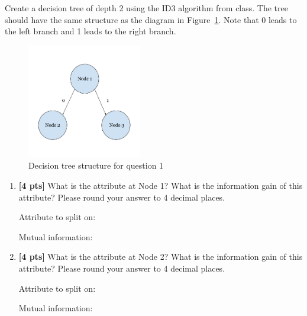 \begin{enumerate}
Create a decision tree of depth 2 using the ID3 algorithm from class. The tree should have the same structure as the diagram in Figure~\ref{fig:tree}. Note that 0 leads to the left branch and 1 leads to the right branch. 
\begin{figure}[ht]
\begin{center}
  \includegraphics[width=5cm]{images/decisiontree.png}
\end{center}
  \caption{Decision tree structure for question 1}
\label{fig:tree}
\end{figure}
\begin{enumerate}[label=(\roman*)]

\newpage

\item \textbf{[4 pts]} What is the attribute at Node 1? What is the information gain of this attribute? Please round your answer to 4 decimal places.

Attribute to split on: \begin{tcolorbox}[fit,height=1.2cm, width=3.5cm, blank, borderline={1pt}{-2pt}, nobeforeafter, box align = center] \end{tcolorbox}
\hspace{0.5cm} Mutual information: \begin{tcolorbox}[fit,height=1.2cm, width=3.5cm, blank, borderline={1pt}{-2pt}, nobeforeafter, box align = center] \end{tcolorbox} 
 
    
\item \textbf{[4 pts]} What is the attribute at Node 2? What is the information gain of this attribute? Please round your answer to 4 decimal places.

Attribute to split on: \begin{tcolorbox}[fit,height=1.2cm, width=3.5cm, blank, borderline={1pt}{-2pt}, nobeforeafter, box align = center] \end{tcolorbox}
\hspace{0.5cm} Mutual information: \begin{tcolorbox}[fit,height=1.2cm, width=3.5cm, blank, borderline={1pt}{-2pt}, nobeforeafter, box align = center] \end{tcolorbox} 



\end{enumerate}
\end{enumerate}
